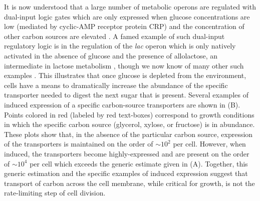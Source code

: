 It is now understood that a large number of metabolic operons are regulated
with dual-input logic gates which are only expressed when glucose
concentrations are low (mediated by cyclic-AMP receptor protein CRP) and the
concentration of other carbon sources are elevated \citep{gama-castro2016, zhang2014a}. A
famed example of such dual-input regulatory logic is in the regulation of the
\textit{lac} operon which is only natively activated in the absence of glucose and the
presence of allolactose, an intermediate in lactose metabolism \citep{jacob1961}, though
we now know of many other such examples \citep{ireland2020, gama-castro2016,
belliveau2018}. This illustrates that once glucose is depleted from the
environment, cells have a means to dramatically increase the abundance of the
specific transporter needed to digest the next sugar that is present. Several
examples of induced expression of a specific carbon-source transporters are
shown in (B). Points colored in red (labeled by red
text-boxes) correspond to growth conditions in which the specific carbon source
(glycerol, xylose, or fructose) is in abundance. These plots show that, in the
absence of the particular carbon source, expression of the transporters is
maintained on the order of $\sim 10^2$ per cell. However, when induced, the
transporters become highly-expressed and are present on the order of $\sim
10^4$ per cell which exceeds the generic estimate given in
(A). Together, this generic estimation and the specific
examples of induced expression suggest that transport of carbon across the cell
membrane, while critical for growth, is not the rate-limiting step of cell division. 

